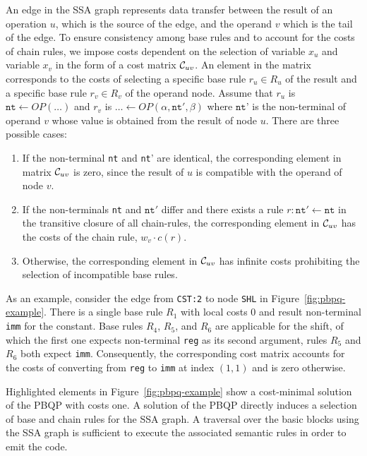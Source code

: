 An edge in the SSA graph represents data transfer between the result
of an operation $u$, which is the source of the edge, and the operand
$v$ which is the tail of the edge.  To ensure consistency among base
rules and to account for the costs of chain rules, we impose costs
dependent on the selection of variable $x_u$ and variable $x_v$ in the
form of a cost matrix $\mathcal C_{uv}$. An element in the matrix
corresponds to the costs of selecting a specific base rule $r_u \in
R_u$ of the result and a specific base rule $r_v \in R_v$ of the
operand node. Assume that $r_u $ is $\texttt{nt} \leftarrow
\textit{OP} (\dots)$ and $r_v$ is $\dots \leftarrow \textit{OP}
(\alpha, \texttt{nt}', \beta)$ where $\texttt{nt'}$ is the
non-terminal of operand $v$ whose value is obtained from the result of
node $u$. There are three possible cases:
\begin{enumerate}
\item If the non-terminal \texttt{nt} and \texttt{nt}' are identical,
  the corresponding element in matrix $\mathcal C_{uv}$ is zero,
  since the result of $u$ is compatible with the operand of node $v$.
\item If the non-terminals \texttt{nt} and $\texttt{nt}'$ differ and
  there exists a rule $r: \texttt{nt}' \leftarrow \texttt{nt}$ in the
  transitive closure of all chain-rules, the corresponding element in
  $\mathcal C_{uv}$ has the costs of the chain rule, \ie $w_v \cdot
  c(r)$.
\item Otherwise, the corresponding element in $\mathcal C_{uv}$ has
  infinite costs prohibiting the selection of incompatible base rules.
\end{enumerate}

As an example, consider the edge from \texttt{CST:2} to node
\texttt{SHL} in Figure~\ref{fig:pbpq-example}. There is a single base
rule $R_1$ with local costs 0 and result non-terminal \texttt{imm} for
the constant. Base rules $R_4$, $R_5$, and $R_6$ are applicable for
the shift, of which the first one expects non-terminal \texttt{reg} as
its second argument, rules $R_5$ and $R_6$ both expect
\texttt{imm}. Consequently, the corresponding cost matrix accounts for
the costs of converting from \texttt{reg} to \texttt{imm} at index
$(1,1)$ and is zero otherwise.

Highlighted elements in Figure~\ref{fig:pbpq-example} show a
cost-minimal solution of the PBQP with costs one. A solution of the
PBQP directly induces a selection of base and chain rules for the SSA
graph. A traversal over the basic blocks using the SSA graph is
sufficient to execute the associated semantic rules in order to emit
the code.

